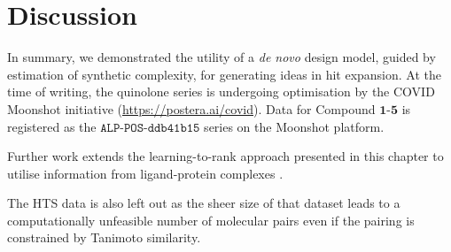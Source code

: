 \section{Discussion} \label{sec:discussion}

In summary, we demonstrated the utility of a \emph{de novo} design model, guided by estimation of synthetic complexity, for generating ideas in hit expansion. At the time of writing, the quinolone series is undergoing optimisation by the COVID Moonshot initiative (\url{https://postera.ai/covid}). Data for Compound $\mathbf{1}$-$\mathbf{5}$ is registered as the $\texttt{ALP-POS-ddb41b15}$ series on the Moonshot platform. 

Further work extends the learning-to-rank approach presented in this chapter to utilise information from ligand-protein complexes \cite{Saar2023pnas}. 

The HTS data is also left out as the sheer size of that dataset leads to a computationally unfeasible number of molecular pairs even if the pairing is constrained by Tanimoto similarity. 





